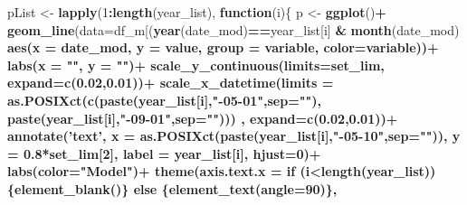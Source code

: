 \documentclass[]{article}
\newenvironment{Shaded}{\begin{snugshade}}{\end{snugshade}}
\newcommand{\ControlFlowTok}[1]{\textcolor[rgb]{0.13,0.29,0.53}{\textbf{#1}}}
\newcommand{\DataTypeTok}[1]{\textcolor[rgb]{0.13,0.29,0.53}{#1}}
\newcommand{\DecValTok}[1]{\textcolor[rgb]{0.00,0.00,0.81}{#1}}
\newcommand{\FloatTok}[1]{\textcolor[rgb]{0.00,0.00,0.81}{#1}}
\newcommand{\KeywordTok}[1]{\textcolor[rgb]{0.13,0.29,0.53}{\textbf{#1}}}
\newcommand{\NormalTok}[1]{#1}
\newcommand{\OperatorTok}[1]{\textcolor[rgb]{0.81,0.36,0.00}{\textbf{#1}}}
\newcommand{\StringTok}[1]{\textcolor[rgb]{0.31,0.60,0.02}{#1}}
\begin{document}
\begin{Shaded}
\begin{Highlighting}[]
\NormalTok{  pList <-}\StringTok{ }\KeywordTok{lapply}\NormalTok{(}\DecValTok{1}\OperatorTok{:}\KeywordTok{length}\NormalTok{(year_list), }\ControlFlowTok{function}\NormalTok{(i)\{ }
\NormalTok{    p <-}\StringTok{ }\KeywordTok{ggplot}\NormalTok{()}\OperatorTok{+}
\StringTok{      }\KeywordTok{geom_line}\NormalTok{(}\DataTypeTok{data=}\NormalTok{df_m[(}\KeywordTok{year}\NormalTok{(date_mod)}\OperatorTok{==}\NormalTok{year_list[i] }\OperatorTok{&}
\StringTok{                                  }\KeywordTok{month}\NormalTok{(date_mod) }\OperatorTok{%in%}\StringTok{ }\DecValTok{5}\OperatorTok{:}\DecValTok{8}\NormalTok{),],}
                \KeywordTok{aes}\NormalTok{(}\DataTypeTok{x =}\NormalTok{ date_mod, }
                    \DataTypeTok{y =}\NormalTok{ value,}
                    \DataTypeTok{group =}\NormalTok{ variable, }
                    \DataTypeTok{color=}\NormalTok{variable))}\OperatorTok{+}
\StringTok{      }\KeywordTok{labs}\NormalTok{(}\DataTypeTok{x =} \StringTok{""}\NormalTok{, }\DataTypeTok{y =} \StringTok{""}\NormalTok{)}\OperatorTok{+}
\StringTok{      }\KeywordTok{scale_y_continuous}\NormalTok{(}\DataTypeTok{limits=}\NormalTok{set_lim,  }\DataTypeTok{expand=}\KeywordTok{c}\NormalTok{(}\FloatTok{0.02}\NormalTok{,}\FloatTok{0.01}\NormalTok{))}\OperatorTok{+}
\StringTok{      }\KeywordTok{scale_x_datetime}\NormalTok{(}\DataTypeTok{limits =} \KeywordTok{as.POSIXct}\NormalTok{(}\KeywordTok{c}\NormalTok{(}\KeywordTok{paste}\NormalTok{(year_list[i],}\StringTok{"-05-01"}\NormalTok{,}\DataTypeTok{sep=}\StringTok{""}\NormalTok{),}
                                             \KeywordTok{paste}\NormalTok{(year_list[i],}\StringTok{"-09-01"}\NormalTok{,}\DataTypeTok{sep=}\StringTok{""}\NormalTok{))) ,}
                                           \DataTypeTok{expand=}\KeywordTok{c}\NormalTok{(}\FloatTok{0.02}\NormalTok{,}\FloatTok{0.01}\NormalTok{))}\OperatorTok{+}
\StringTok{      }\KeywordTok{annotate}\NormalTok{(}\StringTok{'text'}\NormalTok{, }
               \DataTypeTok{x =} \KeywordTok{as.POSIXct}\NormalTok{(}\KeywordTok{paste}\NormalTok{(year_list[i],}\StringTok{"-05-10"}\NormalTok{,}\DataTypeTok{sep=}\StringTok{""}\NormalTok{)),}
               \DataTypeTok{y =} \FloatTok{0.8}\OperatorTok{*}\NormalTok{set_lim[}\DecValTok{2}\NormalTok{], }
               \DataTypeTok{label =}\NormalTok{ year_list[i],}
               \DataTypeTok{hjust=}\DecValTok{0}\NormalTok{)}\OperatorTok{+}
\StringTok{      }\KeywordTok{labs}\NormalTok{(}\DataTypeTok{color=}\StringTok{"Model"}\NormalTok{)}\OperatorTok{+}
\StringTok{      }\KeywordTok{theme}\NormalTok{(}\DataTypeTok{axis.text.x =} \ControlFlowTok{if}\NormalTok{ (i}\OperatorTok{<}\KeywordTok{length}\NormalTok{(year_list)) \{}\KeywordTok{element_blank}\NormalTok{()\} }\ControlFlowTok{else}\NormalTok{ \{}\KeywordTok{element_text}\NormalTok{(}\DataTypeTok{angle=}\DecValTok{90}\NormalTok{)\},}
}
\end{Highlighting}
\end{Shaded}
\end{document}
